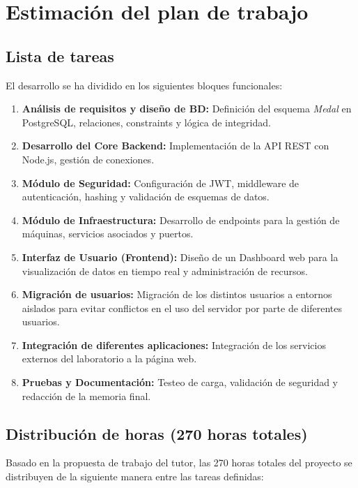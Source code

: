 
\chapter{Estimación del plan de trabajo}

\section{Lista de tareas}
El desarrollo se ha dividido en los siguientes bloques funcionales:

\begin{enumerate}[label=\textbf{T\arabic*.}]
    \item \textbf{Análisis de requisitos y diseño de BD:} Definición del esquema \textit{Medal} en PostgreSQL, relaciones, constraints y lógica de integridad.
    \item \textbf{Desarrollo del Core Backend:} Implementación de la API REST con Node.js, gestión de conexiones.
    \item \textbf{Módulo de Seguridad:} Configuración de JWT, middleware de autenticación, hashing y validación de esquemas de datos.
    \item \textbf{Módulo de Infraestructura:} Desarrollo de endpoints para la gestión de máquinas, servicios asociados y puertos.
    \item \textbf{Interfaz de Usuario (Frontend):} Diseño de un Dashboard web para la visualización de datos en tiempo real y administración de recursos.
    \item \textbf{Migración de usuarios:} Migración de los distintos usuarios a entornos aislados para evitar conflictos en el uso del servidor por parte de diferentes usuarios. 
    \item \textbf{Integración de diferentes aplicaciones:} Integración de los servicios externos del laboratorio a la página web.
    \item \textbf{Pruebas y Documentación:} Testeo de carga, validación de seguridad y redacción de la memoria final.
\end{enumerate}

\section{Distribución de horas (270 horas totales)}

Basado en la propuesta de trabajo del tutor, las 270 horas totales del proyecto se distribuyen de la siguiente manera entre las tareas definidas:

